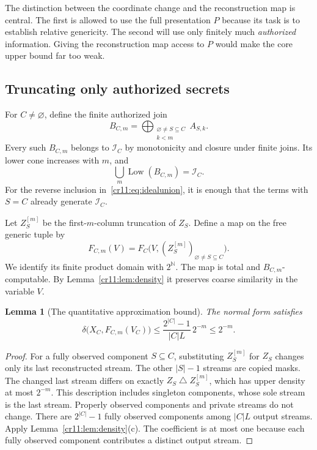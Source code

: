 \documentclass[11pt,letterpaper]{article}
\theoremstyle{plain}
\newtheorem{lemma}[theorem]{Lemma}
\theoremstyle{definition}
\theoremstyle{remark}
\numberwithin{equation}{section}
\newcommand{\N}{\mathbb N}
\newcommand{\Cantor}{2^{\N}}
\newcommand{\Low}{\operatorname{Low}}
\newcommand{\bitsum}{\mathbin{\triangle}}
\newcommand{\I}{\mathcal I}
\begin{document}
The distinction between the coordinate change and the reconstruction map
is central. The first is allowed to use the full presentation $P$ because
its task is to establish relative genericity. The second will use only
finitely much \emph{authorized} information. Giving the reconstruction map
access to $P$ would make the core upper bound far too weak.

\subsection{Truncating only authorized secrets}

For $C\ne\varnothing$, define the finite authorized join
\begin{equation}\label{cr11:eq:bcm}
 B_{C,m}=\bigoplus_{\substack{\varnothing\ne S\subseteq C\\ k<m}}A_{S,k}.
\end{equation}
Every such $B_{C,m}$ belongs to $\I_C$ by monotonicity and closure under
finite joins. Its lower cone increases with $m$, and
\begin{equation}\label{cr11:eq:idealunion}
                   \bigcup_m\Low(B_{C,m})=\I_C.
\end{equation}
For the reverse inclusion in~\eqref{cr11:eq:idealunion}, it is enough that the
terms with $S=C$ already generate $\I_C$.

Let $Z_S^{[m]}$ be the first-$m$-column truncation of $Z_S$. Define a map on
the free generic tuple by
\begin{equation}\label{cr11:eq:fcm}
 F_{C,m}(V)=F_C\bigl(V,(Z_S^{[m]})_{\varnothing\ne S\subseteq C}\bigr).
\end{equation}
We identify its finite product domain with $\Cantor$. The map is total and
$B_{C,m}$-computable. By Lemma~\ref{cr11:lem:density} it preserves coarse
similarity in the variable $V$.

\begin{lemma}[The quantitative approximation bound]\label{cr11:lem:approx}
The normal form satisfies
\begin{equation}\label{cr11:eq:approx}
 \delta\bigl(X_C,F_{C,m}(V_C)\bigr)
     \leq\frac{2^{|C|}-1}{|C|L}\,2^{-m}\leq2^{-m}.
\end{equation}
\end{lemma}
\begin{proof}
For a fully observed component $S\subseteq C$, substituting
$Z_S^{[m]}$ for $Z_S$ changes only its last reconstructed stream. The
other $|S|-1$ streams are copied masks. The changed last stream differs on
exactly $Z_S\bitsum Z_S^{[m]}$, which has upper density at most $2^{-m}$.
This description includes singleton components, whose sole stream is the
last stream. Properly observed components and private streams do not change.
There are $2^{|C|}-1$ fully observed components among $|C|L$ output streams.
Apply Lemma~\ref{cr11:lem:density}(c). The coefficient is at most one because
each fully observed component contributes a distinct output stream.
\end{proof}
\end{document}
